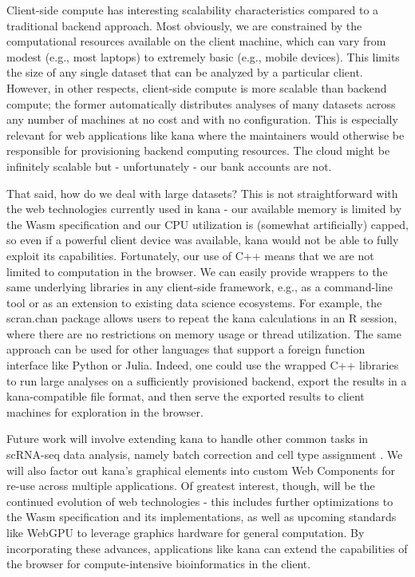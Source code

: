 \documentclass{article}
\begin{document}
Client-side compute has interesting scalability characteristics compared to a traditional backend approach.
Most obviously, we are constrained by the computational resources available on the client machine,
which can vary from modest (e.g., most laptops) to extremely basic (e.g., mobile devices).
This limits the size of any single dataset that can be analyzed by a particular client.
However, in other respects, client-side compute is more scalable than backend compute;
the former automatically distributes analyses of many datasets across any number of machines at no cost and with no configuration.
This is especially relevant for web applications like kana where the maintainers would otherwise be responsible for provisioning backend computing resources.
The cloud might be infinitely scalable but - unfortunately - our bank accounts are not.

That said, how do we deal with large datasets?
This is not straightforward with the web technologies currently used in kana -
our available memory is limited by the Wasm specification and our CPU utilization is (somewhat artificially) capped,
so even if a powerful client device was available, kana would not be able to fully exploit its capabilities.
Fortunately, our use of C++ means that we are not limited to computation in the browser.
We can easily provide wrappers to the same underlying libraries in any client-side framework, e.g., as a command-line tool or as an extension to existing data science ecosystems.
For example, the scran.chan package \cite{scranchan} allows users to repeat the kana calculations in an R session,
where there are no restrictions on memory usage or thread utilization.
The same approach can be used for other languages that support a foreign function interface like Python or Julia.
Indeed, one could use the wrapped C++ libraries to run large analyses on a sufficiently provisioned backend, 
export the results in a kana-compatible file format,
and then serve the exported results to client machines for exploration in the browser. 

Future work will involve extending kana to handle other common tasks in scRNA-seq data analysis,
namely batch correction \cite{haghverdi2018batch} and cell type assignment \cite{aran2019reference}.
We will also factor out kana's graphical elements into custom Web Components for re-use across multiple applications. 
Of greatest interest, though, will be the continued evolution of web technologies -
this includes further optimizations to the Wasm specification and its implementations,
as well as upcoming standards like WebGPU to leverage graphics hardware for general computation.
By incorporating these advances, applications like kana can extend the capabilities of the browser for compute-intensive bioinformatics in the client.
\end{document}

